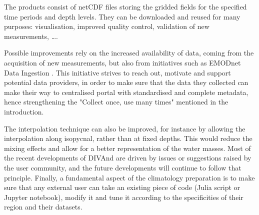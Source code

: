 \documentclass[essd,manuscript]{copernicus}
\begin{document}
The products consist of netCDF files storing the gridded fields for the specified time periods and depth levels. They can be downloaded and reused for many purposes: visualisation, improved quality control, validation of new measurements, \ldots. 

Possible improvements rely on the increased availability of data, coming from the acquisition of new measurements, but also from initiatives such as EMODnet Data Ingestion \citep{IONA2024}. This initiative strives to reach out, motivate and support potential data providers, in order to make sure that the data they collected can make their way to centralised portal with standardised and complete metadata, hence strengthening the "Collect once, use many times" mentioned in the introduction. 

The interpolation technique can also be improved, for instance by allowing the interpolation along isopycnal, rather than at fixed depths. This would reduce the mixing effects and allow for a better representation of the water masses. Most of the recent developments of DIVAnd are driven by issues or suggestions raised by the user community, and the future developments will continue to follow that principle. Finally, a fundamental aspect of the climatology preparation is to make sure that any external user can take an existing piece of code (Julia script or Jupyter notebook), modify it and tune it according to the specificities of their region and their datasets. 
\end{document}

